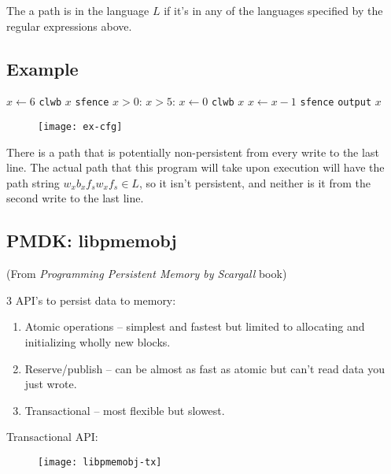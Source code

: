 \documentclass[11pt]{article}
\begin{document}
The a path is in the language $L$ if it's in any of the languages specified by the regular expressions above.

\newpage
\subsection{Example}
\begin{codebox}
  \li $x \gets 6$
  \li \texttt{clwb} $x$
  \li \texttt{sfence}
  \li \While $x > 0$:
  \Do
    \li \If $x>5$:
    \li \Then $x \gets 0$
        \li \texttt{clwb} $x$
    \li \Else
    \li $x \gets x - 1$
        \End
    \li \texttt{sfence}
  \End
  \li \texttt{output} $x$
\end{codebox}

\begin{figure}[h]
    \centering
    \texttt{[image: ex-cfg]}
\end{figure}
There is a path that is potentially non-persistent from every write to the last line. The actual path that this program will take upon execution will have the path string $w_x b_x f_s w_x f_s \in L$, so it isn't persistent, and neither is it from the second write to the last line.

\newpage
\subsection{PMDK: libpmemobj}
(From \textit{Programming Persistent Memory by Scargall} book)

3 API's to persist data to memory:
\begin{enumerate}
    \item Atomic operations -- simplest and fastest but limited to allocating and initializing wholly new blocks.
    \item Reserve/publish -- can be almost as fast as atomic but can't read data you just wrote.
    \item Transactional -- most flexible but slowest.
\end{enumerate}

\noindent Transactional API:
\begin{figure}[h]
    \texttt{[image: libpmemobj-tx]}
\end{figure}
\end{document}
